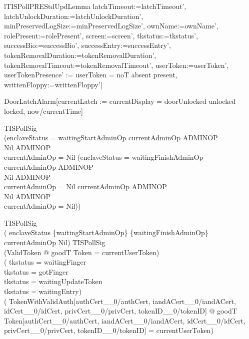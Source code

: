 \begin{theorem}{lTISPollPREStdUpdLemma}
                        latchTimeout:=latchTimeout',
                        latchUnlockDuration:=latchUnlockDuration',
                        minPreservedLogSize:=minPreservedLogSize', %
                        ownName:=ownName', rolePresent:=rolePresent',
                        screen:=screen', tkstatus:=tkstatus', successBio:=successBio',
                        successEntry:=successEntry',
                        tokenRemovalDuration:=tokenRemovalDuration',
                        tokenRemovalTimeout:=tokenRemovalTimeout',
                        userToken:=userToken',
                        userTokenPresence'
                          := \IF userToken = noT \THEN absent \ELSE present,
                        writtenFloppy:=writtenFloppy']
\end{theorem}

DoorLatchAlarm[currentLatch
                          := \IF currentDisplay = doorUnlocked
                             \THEN unlocked
                             \ELSE locked, now/currentTime]

 TISPollSig \\
\implies (\IF enclaveStatus = waitingStartAdminOp
          \THEN       currentAdminOp \in \power ADMINOP \\
                \land Nil \in \power ADMINOP \\
                \land \lnot currentAdminOp = Nil
          \ELSE (\IF enclaveStatus = waitingFinishAdminOp
                 \THEN       currentAdminOp \in \power ADMINOP \\
                       \land Nil \in \power ADMINOP \\
                       \land \lnot currentAdminOp = Nil
                 \ELSE                currentAdminOp \in \power ADMINOP \\
                                \land Nil \in \power ADMINOP \\
                       \implies currentAdminOp = Nil))

 TISPollSig \\
\implies (     enclaveStatus
               \in \{waitingStartAdminOp\} \cup \{waitingFinishAdminOp\} \\
          \iff currentAdminOp \neq Nil)
   TISPollSig \\
         \land
          \lnot (\exists ValidToken @ goodT \theta Token = currentUserToken) \\
         \land (     tkstatus = waitingFinger \\
                \lor tkstatus = gotFinger \\
                \lor tkstatus = waitingUpdateToken \\
                \lor tkstatus = waitingEntry) \\
\implies
 (\exists
    TokenWithValidAuth[authCert\_\_0/authCert, iandACert\_\_0/iandACert,
                       idCert\_\_0/idCert, privCert\_\_0/privCert,
                       tokenID\_\_0/tokenID]
    @ goodT
      \theta
        Token[authCert\_\_0/authCert, iandACert\_\_0/iandACert,
              idCert\_\_0/idCert, privCert\_\_0/privCert, tokenID\_\_0/tokenID]
      = currentUserToken)

